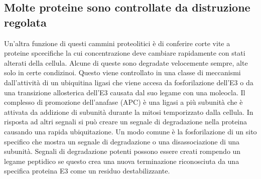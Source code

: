 \subsection{Molte proteine sono controllate da distruzione regolata}
Un'altra funzione di questi cammini proteolitici \`e di conferire corte vite a proteine spcecifiche la cui concentrazione deve cambiare rapidamente con stati alterati della cellula. 
Alcune di queste sono degradate velocemente sempre, alte solo in certe condizinoi. Questo viene controllato in una classe di meccanismi dall'attivit\`a di un ubiquitina ligasi che viene
accesa da fosforilazione dell'E3 o da una transizione allosterica dell'E3 causata dal suo legame con una moleocla. Il complesso di promozione dell'anafase (APC) \`e una ligasi a pi\`u
subunit\`a che \`e attivata da addizione di subunit\`a durante la mitosi temporizzato dalla cellula. In risposta ad altri segnali si pu\`o creare un segnale di degradazione nella 
proteina causando una rapida ubiquitazione. Un modo comune \`e la fosforilazione di un  sito specifico che mostra un segnale di degradazione o una disassociazione di una subunit\`a. 
Segnali di degradazione potenti possono essere creati rompendo un legame peptidico se questo crea una nuova terminazione  riconosciuta da una specifica proteina E3 come un
residuo destabilizzante. 
